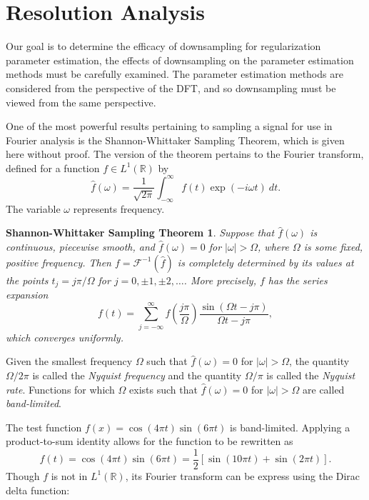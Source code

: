 \documentclass[12pt,notitlepage]{report}
\newtheorem*{SWST}{Shannon-Whittaker Sampling Theorem}
\begin{document}
\section{Resolution Analysis} \label{ch:Resolution Analysis}
Our goal is to determine the efficacy of downsampling for regularization parameter estimation, the effects of downsampling on the parameter estimation methods must be carefully examined. The parameter estimation methods are considered from the perspective of the DFT, and so downsampling must be viewed from the same perspective. \par 
One of the most powerful results pertaining to sampling a signal for use in Fourier analysis is the Shannon-Whittaker Sampling Theorem, which is given here without proof. The version of the theorem pertains to the Fourier transform, defined for a function $f \in L^1(\mathbb{R})$ by
\begin{equation}
\widehat{f}(\omega) = \frac{1}{\sqrt{2\pi}}\int_{-\infty}^{\infty} f(t)\exp(-i\omega{t})\: dt. 
\label{eq:FourierTransform}
\end{equation}
The variable $\omega$ represents frequency. 
\begin{SWST}
Suppose that $\widehat{f}(\omega)$ is continuous, piecewise smooth, and $\widehat{f}(\omega) = 0$ for $|\omega| > \Omega$, where $\Omega$ is some fixed, positive frequency. Then $f = \mathcal{F}^{-1}(\widehat{f})$ is completely determined by its values at the points $t_j = j\pi/\Omega$ for $j = 0,\pm 1,\pm 2,\ldots$. More precisely, $f$ has the series expansion
\[f(t) = \sum_{j=-\infty}^{\infty} f\left(\frac{j\pi}{\Omega}\right)\frac{\sin(\Omega{t}-j\pi)}{\Omega{t}-j\pi},\]
which converges uniformly. 
\end{SWST}
Given the smallest frequency $\Omega$ such that $\widehat{f}(\omega) = 0$ for $|\omega| > \Omega$, the quantity $\Omega/2\pi$ is called the \textit{Nyquist frequency} and the quantity $\Omega/\pi$ is called the \textit{Nyquist rate}. Functions for which $\Omega$ exists such that $\widehat{f}(\omega) = 0$ for $|\omega| > \Omega$ are called \textit{band-limited}. \par 
The test function $f(x) = \cos(4\pi{t})\sin(6\pi{t})$ is band-limited. Applying a product-to-sum identity allows for the function to be rewritten as
\begin{equation}
f(t) = \cos(4\pi{t})\sin(6\pi{t}) = \frac{1}{2}\left[\sin(10\pi{t}) + \sin(2\pi{t})\right].
\label{eq:Test Function 1}
\end{equation}
Though $f$ is not in $L^1(\mathbb{R})$, its Fourier transform can be express using the Dirac delta function:
\end{document}
